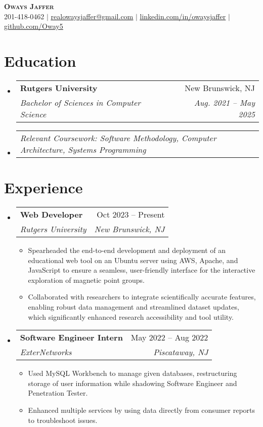 \documentclass[letterpaper,12pt]{article}
\makeatletter
\newcommand{\resumeItem}[1]{
  \item\small{
    {#1 \vspace{-2pt}}
  }
}
\newcommand{\resumeSubheading}[4]{
  \vspace{-2pt}\item
    \begin{tabular*}{0.97\textwidth}[t]{l@{\extracolsep{\fill}}r}
      \textbf{#1} & #2 \\
      \textit{\small#3} & \textit{\small #4} \\
    \end{tabular*}\vspace{-7pt}
}
\newcommand{\resumeSubheadingCoursework}[1]{
  \item
    \begin{tabular*}{0.97\textwidth}{l@{\extracolsep{\fill}}r}
      \textit{\small#1} \\
    \end{tabular*}\vspace{-7pt}
}
\newcommand{\resumeSubHeadingListStart}{\begin{itemize}[leftmargin=0.15in, label={}]}
\newcommand{\resumeSubHeadingListEnd}{\end{itemize}}
\newcommand{\resumeItemListStart}{\begin{itemize}}
\newcommand{\resumeItemListEnd}{\end{itemize}\vspace{-5pt}}
\makeatother
\begin{document}
\begin{center}
    \textbf{ \scshape Oways Jaffer} \\ \vspace{1pt}
    \small 201-418-0462 $|$ \href{mailto:realowaysjaffer@gmail.com}{\underline{realowaysjaffer@gmail.com}} $|$ 
    \href{https://linkedin.com/in/oways}{\underline{linkedin.com/in/owaysjaffer}} $|$
    \href{https://github.com/oway5}{\underline{github.com/Oway5}}
\end{center}


\section{Education}
  \resumeSubHeadingListStart
    \resumeSubheading
      {Rutgers University}{New Brunswick, NJ}
      {Bachelor of Sciences in Computer Science}{Aug. 2021 -- May 2025}
      \resumeSubheadingCoursework
      {Relevant Coursework: Software Methodology, Computer Architecture, Systems Programming}
    
  \resumeSubHeadingListEnd


\section{Experience}
  \resumeSubHeadingListStart

    \resumeSubheading
      {Web Developer}{Oct 2023 -- Present}
      {Rutgers University}{New Brunswick, NJ}
      \resumeItemListStart
        \resumeItem{Spearheaded the end-to-end development and deployment of an educational web tool on an Ubuntu server using AWS, Apache, and JavaScript to ensure a seamless, user-friendly interface for the interactive exploration of magnetic point groups.}
        \resumeItem{Collaborated with researchers to integrate scientifically accurate features, enabling robust data management and streamlined dataset updates, which significantly enhanced research accessibility and tool utility.}
      \resumeItemListEnd
      \resumeSubheading
      {Software Engineer Intern}{May 2022 -- Aug 2022}
      {ExterNetworks}{Piscataway, NJ}
      \resumeItemListStart
        \resumeItem{Used MySQL Workbench to manage given databases, restructuring storage of user information while shadowing Software Engineer and Penetration Tester.}
        \resumeItem{Enhanced multiple services by using data directly from consumer reports to troubleshoot issues.}
      \resumeItemListEnd
  \resumeSubHeadingListEnd
\end{document}
